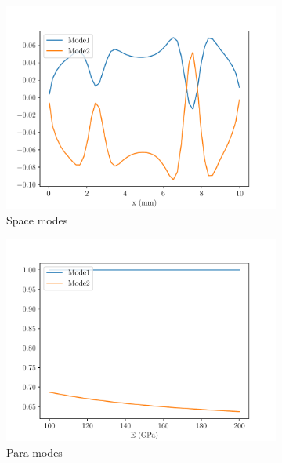 \begin{figure}
\begin{subfigure}[t]{0.5\linewidth}
    \centering
    \includegraphics[width=\linewidth]{Figures/Pre_trained_Space_modes2BCs.pdf}
    \caption{Space modes}
\end{subfigure}
  \begin{subfigure}[t]{0.5\linewidth}
    \centering
    \includegraphics[width=\linewidth]{Figures/Pre_trained_Para_modes2BCs.pdf}
    \caption{Para modes}
\end{subfigure}  
  \begin{subfigure}[t]{0.5\linewidth}
    \centering

\end{subfigure}
\end{figure}
